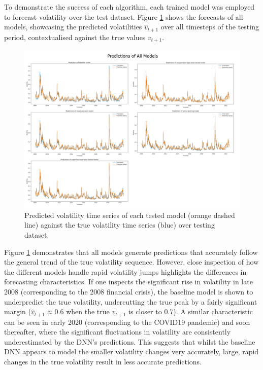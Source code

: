 \documentclass[a4paper, 11pt]{report}
\begin{document}
    To demonstrate the success of each algorithm, each trained model was employed to forecast volatility over the test dataset. Figure \ref{fig: predictions} shows the forecasts of all models, showcasing the predicted volatilities $\hat{v}_{t+1}$ over all timesteps of the testing period, contextualised against the true values $v_{t+1}$.


    \begin{figure}[ht!]
        \centering
        \includegraphics[width=\textwidth]{results/all-predictions.png}
        \caption{\centering Predicted volatility time series of each tested model (orange dashed line) against the true volatility time series (blue) over testing dataset.}
        \label{fig: predictions}
    \end{figure}


    Figure \ref{fig: predictions} demonstrates that all models  generate predictions that accurately follow the general trend of the true volatility sequence. However, close inspection of how the different models handle rapid volatility jumps highlights the differences in forecasting characteristics. If one inspects the significant rise in volatility in late 2008 (corresponding to the 2008 financial crisis), the baseline model is shown to underpredict the true volatility, undercutting the true peak by a fairly significant margin ($\hat{v}_{t+1} \approx 0.6$ when the true $v_{t+1}$ is closer to $0.7$). A similar characteristic can be seen in early 2020 (corresponding to the COVID19 pandemic) and soon thereafter, where the significant fluctuations in volatility are consistently underestimated by the DNN's predictions. This suggests that whilst the baseline DNN appears to model the smaller volatility changes very accurately, large, rapid changes in the true volatility result in less accurate predictions. 
\end{document}
